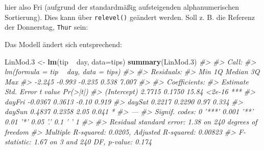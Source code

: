 \documentclass[12pt,]{book}
\makeatletter
\newenvironment{Shaded}{\begin{snugshade}}{\end{snugshade}}
\newcommand{\KeywordTok}[1]{\textcolor[rgb]{0.13,0.29,0.53}{\textbf{{#1}}}}
\newcommand{\DataTypeTok}[1]{\textcolor[rgb]{0.13,0.29,0.53}{{#1}}}
\newcommand{\FloatTok}[1]{\textcolor[rgb]{0.00,0.00,0.81}{{#1}}}
\newcommand{\StringTok}[1]{\textcolor[rgb]{0.31,0.60,0.02}{{#1}}}
\newcommand{\CommentTok}[1]{\textcolor[rgb]{0.56,0.35,0.01}{\textit{{#1}}}}
\newcommand{\NormalTok}[1]{{#1}}
\newenvironment{kframe}{%
\medskip{}
\setlength{\fboxsep}{.8em}
 \def\at@end@of@kframe{}%
 \ifinner\ifhmode%
  \def\at@end@of@kframe{\end{minipage}}%
  \begin{minipage}{\columnwidth}%
 \fi\fi%
 \def\FrameCommand##1{\hskip\@totalleftmargin \hskip-\fboxsep
 \colorbox{shadecolor}{##1}\hskip-\fboxsep
     \hskip-\linewidth \hskip-\@totalleftmargin \hskip\columnwidth}%
 \MakeFramed {\advance\hsize-\width
   \@totalleftmargin\z@ \linewidth\hsize
   \@setminipage}}%
 {\par\unskip\endMakeFramed%
 \at@end@of@kframe}
\renewenvironment{Shaded}{\begin{kframe}}{\end{kframe}}
\makeatother
\begin{document}
\begin{Shaded}
\end{Shaded}

hier also Fri (aufgrund der standardmäßig aufsteigenden alphanumerischen
Sortierung). Dies kann über \texttt{relevel()} geändert werden. Soll z.
B. die Referenz der Donnerstag, \texttt{Thur} sein:

\begin{Shaded}
\end{Shaded}

Das Modell ändert sich entsprechend:

\begin{Shaded}
\begin{Highlighting}[]
\NormalTok{LinMod}\FloatTok{.3} \NormalTok{<-}\StringTok{ }\KeywordTok{lm}\NormalTok{(tip ~}\StringTok{ }\NormalTok{day, }\DataTypeTok{data=}\NormalTok{tips)}
\KeywordTok{summary}\NormalTok{(LinMod}\FloatTok{.3}\NormalTok{)}
\CommentTok{#> }
\CommentTok{#> Call:}
\CommentTok{#> lm(formula = tip ~ day, data = tips)}
\CommentTok{#> }
\CommentTok{#> Residuals:}
\CommentTok{#>    Min     1Q Median     3Q    Max }
\CommentTok{#> -2.245 -0.993 -0.235  0.538  7.007 }
\CommentTok{#> }
\CommentTok{#> Coefficients:}
\CommentTok{#>             Estimate Std. Error t value Pr(>|t|)    }
\CommentTok{#> (Intercept)   2.7715     0.1750   15.84   <2e-16 ***}
\CommentTok{#> dayFri       -0.0367     0.3613   -0.10    0.919    }
\CommentTok{#> daySat        0.2217     0.2290    0.97    0.334    }
\CommentTok{#> daySun        0.4837     0.2358    2.05    0.041 *  }
\CommentTok{#> ---}
\CommentTok{#> Signif. codes:  0 '***' 0.001 '**' 0.01 '*' 0.05 '.' 0.1 ' ' 1}
\CommentTok{#> }
\CommentTok{#> Residual standard error: 1.38 on 240 degrees of freedom}
\CommentTok{#> Multiple R-squared:  0.0205, Adjusted R-squared:  0.00823 }
\CommentTok{#> F-statistic: 1.67 on 3 and 240 DF,  p-value: 0.174}
\end{Highlighting}
\end{Shaded}
\end{document}
